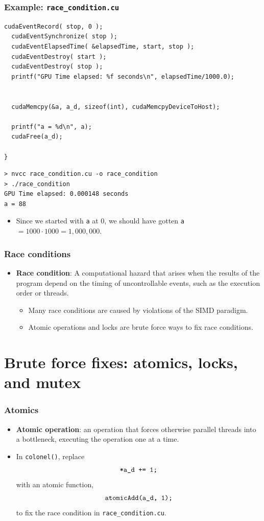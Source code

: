 \documentclass[handout]{beamer}
\numberwithin{equation}{section}
\begin{document}
\begin{frame}[fragile]
\frametitle{Example: {\tt race\_condition.cu}} \lstset{basicstyle=\tiny}
\begin{lstlisting}[name=racecon]
  cudaEventRecord( stop, 0 );
  cudaEventSynchronize( stop );
  cudaEventElapsedTime( &elapsedTime, start, stop );
  cudaEventDestroy( start );
  cudaEventDestroy( stop );
  printf("GPU Time elapsed: %f seconds\n", elapsedTime/1000.0);
  
  
  cudaMemcpy(&a, a_d, sizeof(int), cudaMemcpyDeviceToHost);

  printf("a = %d\n", a);
  cudaFree(a_d);

}
\end{lstlisting}

\begin{lstlisting}
> nvcc race_condition.cu -o race_condition
> ./race_condition
GPU Time elapsed: 0.000148 seconds
a = 88
\end{lstlisting}
\begin{itemize}
\pause \item Since we started with {\tt a} at 0, we should have gotten {\tt a $= 1000 \cdot 1000 = 1,000,000$}.
\end{itemize}
\end{frame}


\begin{frame}
\frametitle{Race conditions}
\begin{itemize}
\pause \item {\bf Race condition}: A computational hazard that arises when the results of the program depend on the timing of uncontrollable events, such as the execution order or threads.
\begin{itemize}
\pause \item Many race conditions are caused by violations of the SIMD paradigm.
\pause \item Atomic operations and locks are brute force ways to fix race conditions.
\end{itemize}
\end{itemize}
\end{frame}

\section{Brute force fixes: atomics, locks, and mutex}

\begin{frame}[fragile]
\frametitle{Atomics}
\begin{itemize}
\item {\bf Atomic operation}: an operation that forces otherwise parallel threads into a bottleneck, executing the operation one at a time. 
\pause \item In {\tt colonel()}, replace
\begin{align*}
\text{\tt *a\_d += 1;}
\end{align*}
\pause with an atomic function,
\begin{align*}
\text{\tt atomicAdd(a\_d, 1);}
\end{align*}
to fix the race condition in {\tt race\_condition.cu}.
\end{itemize}
\end{frame}
\end{document}
